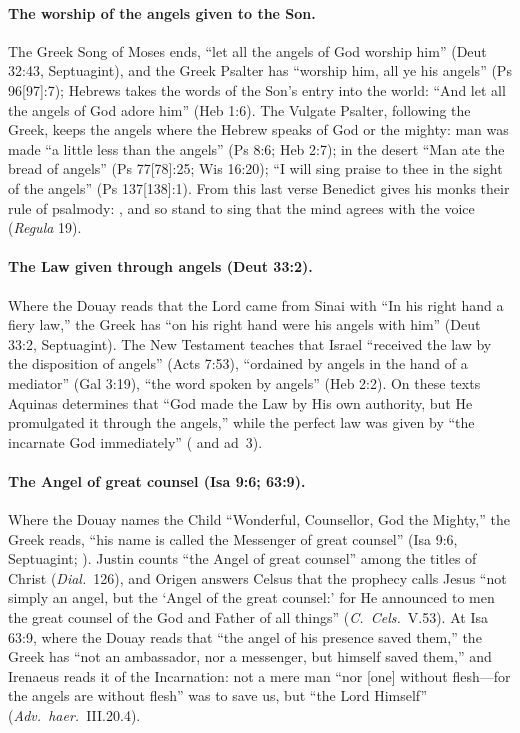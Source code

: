 \paragraph{The worship of the angels given to the Son.} The Greek Song of
Moses ends, ``let all the angels of God worship him'' (Deut 32:43,
Septuagint), and the Greek Psalter has ``worship him, all ye his angels'' (Ps
96[97]:7); Hebrews takes the words of the Son's entry into the world: ``And
let all the angels of God adore him'' (Heb 1:6). The Vulgate Psalter,
following the Greek, keeps the angels where the Hebrew speaks of God or the
mighty: man was made ``a little less than the angels'' (Ps 8:6; Heb 2:7); in
the desert ``Man ate the bread of angels'' (Ps 77[78]:25; Wis 16:20); ``I will
sing praise to thee in the sight of the angels'' (Ps 137[138]:1). From this
last verse Benedict gives his monks their rule of psalmody: , and so stand to sing that the
mind agrees with the voice (\emph{Regula} 19).

\paragraph{The Law given through angels (Deut 33:2).} Where the Douay reads
that the Lord came from Sinai with ``In his right hand a fiery law,'' the
Greek has ``on his right hand were his angels with him'' (Deut 33:2,
Septuagint). The New Testament teaches that Israel ``received the law by the
disposition of angels'' (Acts 7:53), ``ordained by angels in the hand of a
mediator'' (Gal 3:19), ``the word spoken by angels'' (Heb 2:2). On these texts
Aquinas determines that ``God made the Law by His own authority, but He
promulgated it through the angels,'' while the perfect law was given by ``the
incarnate God immediately'' ( and ad~3).

\paragraph{The Angel of great counsel (Isa 9:6; 63:9).} Where the Douay
names the Child ``Wonderful, Counsellor, God the Mighty,'' the Greek reads,
``his name is called the Messenger of great counsel'' (Isa 9:6, Septuagint;
). Justin counts ``the Angel of great
counsel'' among the titles of Christ (\emph{Dial.}\ 126), and Origen answers
Celsus that the prophecy calls Jesus ``not simply an angel, but the `Angel of
the great counsel:' for He announced to men the great counsel of the God and
Father of all things'' (\emph{C.\ Cels.}\ V.53). At Isa 63:9, where the Douay
reads that ``the angel of his presence saved them,'' the Greek has ``not an
ambassador, nor a messenger, but himself saved them,'' and Irenaeus reads it
of the Incarnation: not a mere man ``nor [one] without flesh---for the angels
are without flesh'' was to save us, but ``the Lord Himself'' (\emph{Adv.\
haer.}\ III.20.4).

